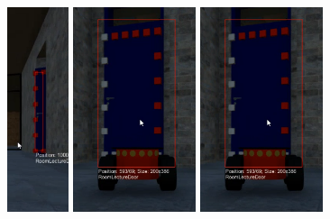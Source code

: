 \begin{figure}[htp]
{{        \includegraphics[height=6cm]{img/ch05/Labelling_W2S05a.png}%
        \includegraphics[height=6cm]{img/ch05/Labelling_W2S06.png}%
        \includegraphics[height=6cm]{img/ch05/Labelling_W2S06.png}%
      }%
    }
    \setlength{\twosubht}{\ht\twosubbox}
    \centering
\end{figure}
